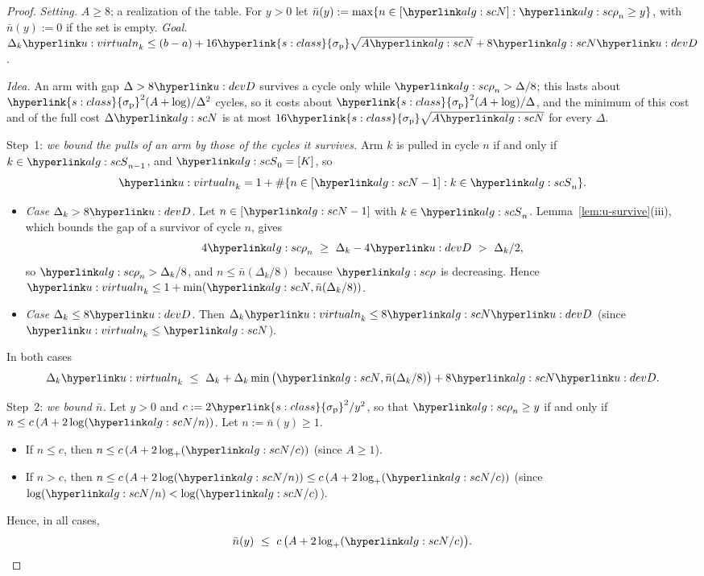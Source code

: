 \documentclass[11pt]{article}
\DeclareRobustCommand{\sy}[2]{{\hyperlink{#1}{#2}}}
\newcommand{\1}{\mathbf{1}}
\newcommand{\sigp}{\sy{s:class}{\sigma_{\mathrm p}}}
\begin{document}
\begin{proof}
\textit{Setting.} $A\ge8$; a realization of the table. For $y>0$ let $\bar n(y):=\max\{n\in[\uN]:\urho_n\ge y\}$, with $\bar n(y):=0$ if the set is empty.
\textit{Goal.} $\Delta_k\upulls_k\le(b-a)+16\sigp\sqrt{A\uN}+8\uN\uD$.

\textit{Idea.} An arm with gap $\Delta>8\uD$ survives a cycle only while $\urho_n>\Delta/8$; this lasts about $\sigp^2(A+\log)/\Delta^2$ cycles, so it costs about
$\sigp^2(A+\log)/\Delta$, and the minimum of this cost and of the full cost $\Delta\uN$ is at most $16\sigp\sqrt{A\uN}$ for every $\Delta$.

Step~1: \emph{we bound the pulls of an arm by those of the cycles it survives.} Arm $k$ is pulled in cycle $n$ if and only if $k\in\uS_{n-1}$, and $\uS_0=[K]$, so
\[
\upulls_k=1+\#\{n\in[\uN-1]:k\in\uS_n\}.
\]
\begin{itemize}
\item \emph{Case $\Delta_k>8\uD$.} Let $n\in[\uN-1]$ with $k\in\uS_n$. Lemma~\ref{lem:u-survive}(iii), which bounds the gap of a survivor of cycle $n$, gives
\[
4\urho_n\ \ge\ \Delta_k-4\uD\ >\ \Delta_k/2 ,
\]
so $\urho_n>\Delta_k/8$, and $n\le\bar n(\Delta_k/8)$ because $\urho$ is decreasing. Hence $\upulls_k\le1+\min(\uN,\bar n(\Delta_k/8))$.
\item \emph{Case $\Delta_k\le8\uD$.} Then $\Delta_k\upulls_k\le8\uN\uD$ (since $\upulls_k\le\uN$).
\end{itemize}
In both cases
\begin{equation}\label{eq:u-cost1}
\Delta_k\upulls_k\ \le\ \Delta_k+\Delta_k\min\big(\uN,\bar n(\Delta_k/8)\big)+8\uN\uD .
\end{equation}

Step~2: \emph{we bound $\bar n$.} Let $y>0$ and $c:=2\sigp^2/y^2$, so that $\urho_n\ge y$ if and only if $n\le c\,(A+2\log(\uN/n))$. Let $n:=\bar n(y)\ge1$.
\begin{itemize}
\item If $n\le c$, then $n\le c\,(A+2\log_+(\uN/c))$ (since $A\ge1$).
\item If $n>c$, then $n\le c\,(A+2\log(\uN/n))\le c\,(A+2\log_+(\uN/c))$ (since $\log(\uN/n)<\log(\uN/c)$).
\end{itemize}
Hence, in all cases,
\[
\bar n(y)\ \le\ c\,\big(A+2\log_+(\uN/c)\big).
\]


\end{proof}
\end{document}

